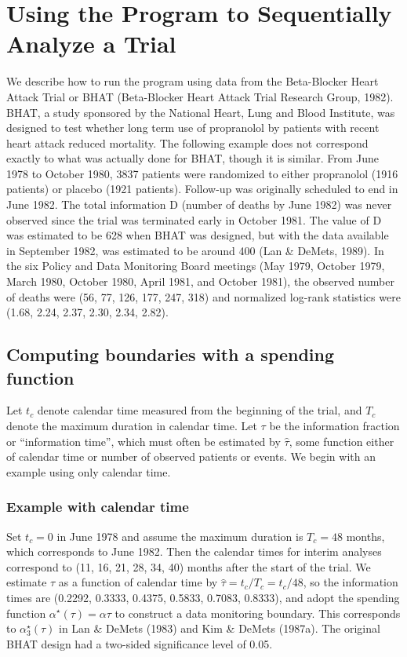 \section{Using the Program to Sequentially Analyze a Trial}
\label{sec-use}

We describe how to run the program using data from the Beta-Blocker Heart
Attack Trial or BHAT (Beta-Blocker Heart Attack Trial Research Group,
1982).  BHAT, a study sponsored by the National Heart, Lung and Blood
Institute, was designed to test whether long term use of propranolol by
patients with recent heart attack reduced mortality.  The following example
does not correspond exactly to what was actually done for BHAT, though it
is similar.  From June 1978 to October 1980, 3837 patients were randomized
to either propranolol (1916 patients) or placebo (1921 patients).
Follow-up was originally scheduled to end in June 1982.  The total
information D (number of deaths by June 1982) was never observed since the
trial was terminated early in October 1981.  The value of D was estimated
to be 628 when BHAT was designed, but with the data available in September
1982, was estimated to be around 400 (Lan \& DeMets, 1989).  In the six
Policy and Data Monitoring Board meetings (May 1979, October 1979, March
1980, October 1980, April 1981, and October 1981), the observed number of
deaths were (56, 77, 126, 177, 247, 318) and normalized log-rank
statistics were (1.68, 2.24, 2.37, 2.30, 2.34, 2.82).


\subsection{Computing boundaries with a spending function}

Let $t_c$ denote calendar time measured from the beginning of the trial,
and $T_c$ denote the maximum duration in calendar time. Let $\tau$ be the
information fraction or ``information time'', which must often be estimated
by $\hat{\tau}$, some function either of calendar time or number of
observed patients or events.  We begin with an example using only calendar
time.


\subsubsection*{Example with calendar time}

Set $t_c = 0$ in June 1978 and assume the maximum duration is $T_c = 48$
months, which corresponds to June 1982.  Then the calendar times for
interim analyses correspond to (11, 16, 21, 28, 34, 40) months after the
start of the trial.  We estimate $\tau$ as a function of calendar time by
$\hat{\tau} = t_c/T_c = t_c/48$, so the information times are (0.2292,
0.3333, 0.4375, 0.5833, 0.7083, 0.8333), and adopt the spending function
$\alpha^{\star}(\tau) = \alpha \tau$ to construct a data monitoring boundary.
This corresponds to $\alpha^{\star}_3(\tau)$ in Lan \& DeMets (1983) and Kim \&
DeMets (1987a).  The original BHAT design had a two-sided significance
level of 0.05.


